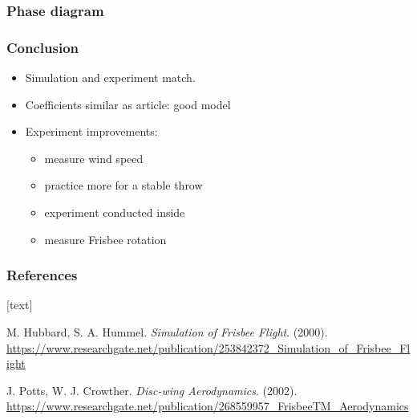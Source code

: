 \documentclass{beamer}
\begin{document}

\begin{frame}

\frametitle{Phase diagram}


\end{frame}


\begin{frame}

\frametitle{Conclusion}

\begin{itemize}
\item Simulation and experiment match.
\item Coefficients similar as article: good model
\item Experiment improvements:

\begin{itemize}
\item measure wind speed 
\item practice more for a stable throw
\item experiment conducted inside
\item measure Frisbee rotation
\end{itemize}

\end{itemize}

\end{frame}


\begin{frame}

\frametitle{References}

[text]

\begin{thebibliography}{9}

M. Hubbard, S. A. Hummel. \textit{Simulation of Frisbee Flight}. (2000). \url{https://www.researchgate.net/publication/253842372_Simulation_of_Frisbee_Flight}

J. Potts, W. J. Crowther. \textit{Disc-wing Aerodynamics}. (2002). \url{https://www.researchgate.net/publication/268559957_FrisbeeTM_Aerodynamics}

\end{thebibliography}

\end{frame}

\end{document}
